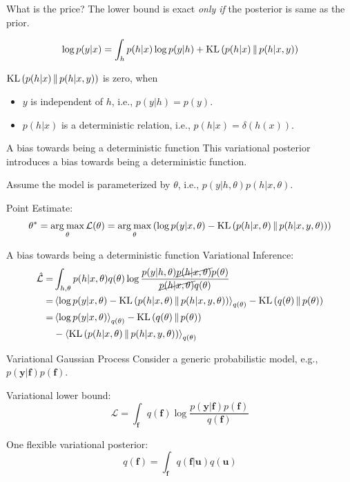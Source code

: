 \documentclass[14pt,aspectratio=1610]{beamer}
\newcommand{\yV}{\mathbf{y}}
\newcommand{\fV}{\mathbf{f}}
\newcommand{\uV}{\mathbf{u}}
\newcommand{\bound}{\mathcal{L}}
\newcommand{\argmax}{\operatorname*{arg\: max}}
\begin{document}
\begin{frame}{What is the price?}
The lower bound is exact \textit{only if} the posterior is same as the prior.

\begin{align*}
\log p(y | x) = \int_{h} p(h|x) \log p(y| h) + \text{KL}\left( p(h|x)\,\|\,p(h|x, y) \right)
\end{align*}

$\text{KL}\left( p(h|x)\,\|\,p(h|x, y) \right)$ is zero, when
\begin{itemize}
\item $y$ is independent of $h$, i.e., $p(y|h) = p(y)$.
\item $p(h|x)$ is a deterministic relation, i.e., $p(h|x) = \delta(h(x))$.
\end{itemize}
\end{frame}

\begin{frame}{A bias towards being a deterministic function}
This variational posterior introduces a bias towards being a deterministic function.

Assume the model is parameterized by $\theta$, i.e., $p(y|h, \theta) p(h|x, \theta)$.

Point Estimate: 
\begin{align*}
\theta^* = \argmax_{\theta} \bound(\theta) = \argmax_{\theta}  \left( \log p(y | x, \theta) - \KL{p(h|x, \theta)}{p(h|x, y, \theta)} \right)
\end{align*}
\end{frame}

\begin{frame}{A bias towards being a deterministic function}
Variational Inference:
\begin{align*}
\hat{\bound} =& \int_{h, \theta} p(h|x, \theta) q(\theta) \log \frac{p(y|h, \theta) \cancel{p(h|x,\theta)} p(\theta)}{\cancel{p(h|x, \theta)} q(\theta)} \\
=& \expectation{\log p(y | x, \theta) - \KL{p(h|x, \theta)}{p(h|x, y, \theta)}}_{q(\theta)} - \KL{q(\theta)}{p(\theta)} \\
=& \expectation{\log p(y | x, \theta)}_{q(\theta)} - \KL{q(\theta)}{p(\theta)} \\
& - \expectation{\KL{p(h|x, \theta)}{p(h|x, y, \theta)}}_{q(\theta)}
\end{align*}
\end{frame}

\begin{frame}{Variational Gaussian Process}
Consider a generic probabilistic model, e.g., $p(\yV | \fV) p(\fV)$.

Variational lower bound:
\[
\bound = \int_{\fV} q(\fV) \log \frac{p(\yV | \fV) p(\fV)}{q(\fV)}
\]

One flexible variational posterior:
\[
q(\fV) = \int_{\fV} q(\fV|\uV) q(\uV)
\]
\end{frame}
\end{document}
